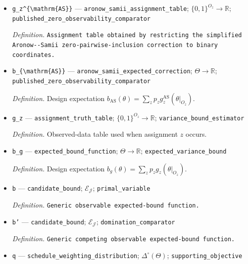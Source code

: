 \documentclass{article}
\begin{document}
\begin{itemize}
  \item \texttt{g\_\allowbreak{}z\textasciicircum{}\{\textbackslash{}\allowbreak{}mathrm\{AS\}\allowbreak{}\}\allowbreak{}} --- \texttt{aronow\_\allowbreak{}samii\_\allowbreak{}assignment\_\allowbreak{}table}; \(\{0,1\}^{O_z}\to\mathbb R\); \texttt{published\_\allowbreak{}zero\_\allowbreak{}observability\_\allowbreak{}comparator}
  \par\smallskip\noindent\emph{Definition.} \texttt{Assignment table obtained by restricting the simplified Aronow-\allowbreak{}-\allowbreak{}Samii zero-\allowbreak{}pairwise-\allowbreak{}inclusion correction to binary coordinates.}
  \item \texttt{b\_\allowbreak{}\{\textbackslash{}\allowbreak{}mathrm\{AS\}\allowbreak{}\}\allowbreak{}} --- \texttt{aronow\_\allowbreak{}samii\_\allowbreak{}expected\_\allowbreak{}correction}; \(\Theta\to\mathbb R\); \texttt{published\_\allowbreak{}zero\_\allowbreak{}observability\_\allowbreak{}comparator}
  \par\smallskip\noindent\emph{Definition.} Design expectation \(b_{\mathrm{AS}}(\theta)=\sum_zp_zg_z^{\mathrm{AS}}(\theta|_{O_z})\).
  \item \texttt{g\_\allowbreak{}z} --- \texttt{assignment\_\allowbreak{}truth\_\allowbreak{}table}; \(\{0,1\}^{O_z}\to\mathbb R\); \texttt{variance\_\allowbreak{}bound\_\allowbreak{}estimator}
  \par\smallskip\noindent\emph{Definition.} Observed-data table used when assignment \(z\) occurs.
  \item \texttt{b\_\allowbreak{}g} --- \texttt{expected\_\allowbreak{}bound\_\allowbreak{}function}; \(\Theta\to\mathbb R\); \texttt{expected\_\allowbreak{}variance\_\allowbreak{}bound}
  \par\smallskip\noindent\emph{Definition.} Design expectation \(b_g(\theta)=\sum_zp_zg_z(\theta|_{O_z})\).
  \item \texttt{b} --- \texttt{candidate\_\allowbreak{}bound}; \(\mathcal E_{\mathcal J}\); \texttt{primal\_\allowbreak{}variable}
  \par\smallskip\noindent\emph{Definition.} \texttt{Generic observable expected-\allowbreak{}bound function.}
  \item \texttt{b'} --- \texttt{candidate\_\allowbreak{}bound}; \(\mathcal E_{\mathcal J}\); \texttt{domination\_\allowbreak{}comparator}
  \par\smallskip\noindent\emph{Definition.} \texttt{Generic competing observable expected-\allowbreak{}bound function.}
  \item \texttt{q} --- \texttt{schedule\_\allowbreak{}weighting\_\allowbreak{}distribution}; \(\Delta^\circ(\Theta)\); \texttt{supporting\_\allowbreak{}objective}

\end{itemize}
\end{document}
